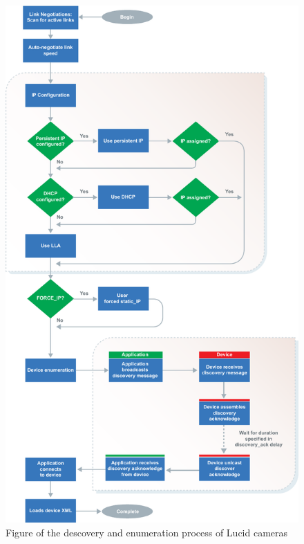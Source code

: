 \begin{figure}
    \centering
    \includegraphics[height=\textheight]{figures/PDF/lucid_ip_discovery.pdf}
    \caption{Figure of the descovery and enumeration process of Lucid cameras \cite{lucidvisionlabsTritonMPPolarized2020}}
    \label{fig:lucid_ip_discovery}
\end{figure}